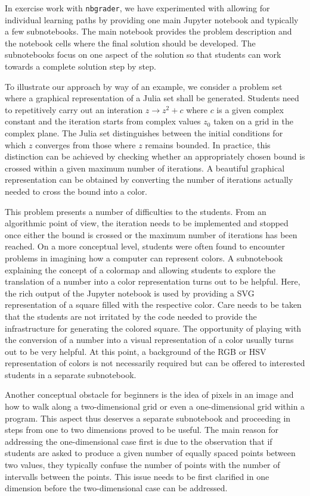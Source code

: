 \documentclass[twocolumn]{svjour3}          %
\begin{document}
In exercise work with \texttt{nbgrader}, we have experimented with allowing for
individual learning paths by providing one main Jupyter notebook and typically
a few subnotebooks. The main notebook provides the problem description and the
notebook cells where the final solution should be developed. The subnotebooks
focus on one aspect of the solution so that students can work towards a complete
solution step by step.

To illustrate our approach by way of an example, we consider a problem set
where a graphical representation of a Julia set shall be generated. Students
need to repetitively carry out an interation $z\rightarrow z^2+c$ where $c$ is
a given complex constant and the iteration starts from complex values $z_0$
taken on a grid in the complex plane. The Julia set distinguishes between the
initial conditions for which $z$ converges from those where $z$ remains bounded.
In practice, this distinction can be achieved by checking whether an appropriately
chosen bound is crossed within a given maximum number of iterations. A beautiful
graphical representation can be obtained by converting the number of iterations
actually needed to cross the bound into a color. 

This problem presents a number of difficulties to the students. From an
algorithmic point of view, the iteration needs to be implemented and stopped
once either the bound is crossed or the maximum number of iterations has been
reached. On a more conceptual level, students were often found to encounter
problems in imagining how a computer can represent colors. A subnotebook
explaining the concept of a colormap and allowing students to explore the
translation of a number into a color representation turns out to be helpful.
Here, the rich output of the Jupyter notebook is used by providing a SVG
representation of a square filled with the respective color. Care needs to
be taken that the students are not irritated by the code needed to provide
the infrastructure for generating the colored square. The opportunity of
playing with the conversion of a number into a visual representation of a
color usually turns out to be very helpful. At this point, a background of
the RGB or HSV representation of colors is not necessarily required but
can be offered to interested students in a separate subnotebook.

Another conceptual obstacle for beginners is the idea of pixels in an image
and how to walk along a two-dimensional grid or even a one-dimensional grid
within a program. This aspect thus deserves a separate subnotebook and proceeding
in steps from one to two dimensions proved to be useful. The main reason for
addressing the one-dimensional case first is due to the observation that if
students are asked to produce a given number of equally spaced points between
two values, they typically confuse the number of points with the number of
intervalls between the points. This issue needs to be first clarified in one
dimension before the two-dimensional case can be addressed.
\end{document}

